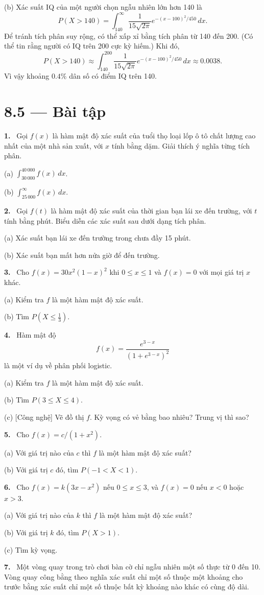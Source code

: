 \documentclass[12pt,a4paper]{article}
\newcommand{\bt}[1]{\par\smallskip\Needspace{5\baselineskip}\noindent\textbf{#1.}\ }
\begin{document}
(b) Xác suất IQ của một người chọn ngẫu nhiên lớn hơn 140 là
\[P(X>140)=\int_{140}^{\infty}\frac1{15\sqrt{2\pi}}e^{-(x-100)^2/450}\,dx.\]
Để tránh tích phân suy rộng, có thể xấp xỉ bằng tích phân từ 140 đến 200. (Có thể tin rằng người có IQ trên 200 cực kỳ hiếm.) Khi đó,
\[P(X>140)\approx\int_{140}^{200}\frac1{15\sqrt{2\pi}}e^{-(x-100)^2/450}\,dx\approx0.0038.\]
Vì vậy khoảng $0.4\%$ dân số có điểm IQ trên 140.

\section*{8.5 — Bài tập}
\bt{1} Gọi $f(x)$ là hàm mật độ xác suất của tuổi thọ loại lốp ô tô chất lượng cao nhất của một nhà sản xuất, với $x$ tính bằng dặm. Giải thích ý nghĩa từng tích phân.

(a) $\displaystyle\int_{30\,000}^{40\,000}f(x)\,dx$.

(b) $\displaystyle\int_{25\,000}^{\infty}f(x)\,dx$.
\bt{2} Gọi $f(t)$ là hàm mật độ xác suất của thời gian bạn lái xe đến trường, với $t$ tính bằng phút. Biểu diễn các xác suất sau dưới dạng tích phân.

(a) Xác suất bạn lái xe đến trường trong chưa đầy 15 phút.

(b) Xác suất bạn mất hơn nửa giờ để đến trường.
\bt{3} Cho $f(x)=30x^2(1-x)^2$ khi $0\le x\le1$ và $f(x)=0$ với mọi giá trị $x$ khác.

(a) Kiểm tra $f$ là một hàm mật độ xác suất.

(b) Tìm $P(X\le\tfrac13)$.
\bt{4} Hàm mật độ
\[f(x)=\frac{e^{3-x}}{(1+e^{3-x})^2}\]
là một ví dụ về phân phối logistic.

(a) Kiểm tra $f$ là một hàm mật độ xác suất.

(b) Tìm $P(3\le X\le4)$.

(c) [Công nghệ] Vẽ đồ thị $f$. Kỳ vọng có vẻ bằng bao nhiêu? Trung vị thì sao?
\bt{5} Cho $f(x)=c/(1+x^2)$.

(a) Với giá trị nào của $c$ thì $f$ là một hàm mật độ xác suất?

(b) Với giá trị $c$ đó, tìm $P(-1<X<1)$.
\bt{6} Cho $f(x)=k(3x-x^2)$ nếu $0\le x\le3$, và $f(x)=0$ nếu $x<0$ hoặc $x>3$.

(a) Với giá trị nào của $k$ thì $f$ là một hàm mật độ xác suất?

(b) Với giá trị $k$ đó, tìm $P(X>1)$.

(c) Tìm kỳ vọng.
\bt{7} Một vòng quay trong trò chơi bàn cờ chỉ ngẫu nhiên một số thực từ 0 đến 10. Vòng quay công bằng theo nghĩa xác suất chỉ một số thuộc một khoảng cho trước bằng xác suất chỉ một số thuộc bất kỳ khoảng nào khác có cùng độ dài.
\end{document}
